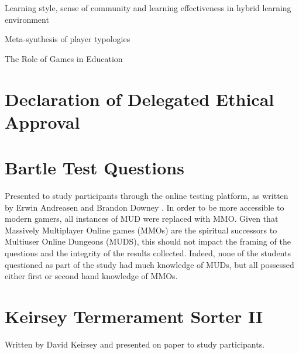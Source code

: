 \documentclass[12pt,a4paper,twoside]{report}
\begin{document}
Learning style, sense of community and learning effectiveness in hybrid learning environment

Meta-synthesis of player typologies

The Role of Games in Education

\begin{appendices}
	
\chapter{Declaration of Delegated Ethical Approval}
\label{sec:bsrec}

	
\chapter{Bartle Test Questions}
\label{sec:bartle}
Presented to study participants through the online testing platform, as written by Erwin Andreasen and Brandon Downey \cite{bartle-questions}. In order to be more accessible to modern gamers, all instances of MUD were replaced with MMO. Given that Massively Multiplayer Online games (MMOs) are the spiritual successors to Multiuser Online Dungeons (MUDS), this should not impact the framing of the questions and the integrity of the results collected. Indeed, none of the students questioned as part of the study had much knowledge of MUDs, but all possessed either first or second hand knowledge of MMOs.
\clearpage
\linespread{1.0}

\linespread{1.3}

\chapter{Keirsey Termerament Sorter II}
\label{sec:keirsey}
Written by David Keirsey \cite{keirsey1998please} and presented on paper to study participants.

\end{appendices}



\end{document}
